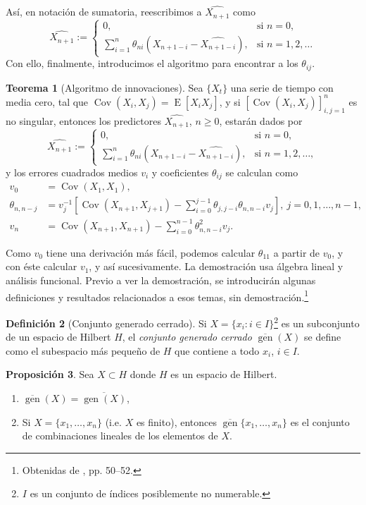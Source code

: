 \documentclass[11pt,letterpaper]{article}
\newcommand{\expected}{\ensuremath{\operatorname{E}}}
\newcommand{\covariance}{\ensuremath{\operatorname{Cov}}}
\theoremstyle{definition}
\newtheorem{definition}{Definición}[section]
\theoremstyle{theorem}
\newtheorem{theorem}[definition]{Teorema}
\newtheorem{proposition}[definition]{Proposición}
\theoremstyle{remark}
\begin{document}
	Así, en notación de sumatoria, reescribimos a \(\hat{X_{n+1}}\) como
	\[\hat{X_{n+1}}:=\begin{cases}0,&\mbox{si }n=0,\\\sum_{i=1}^{n}\theta_{ni}\left(X_{n+1-i}-\hat{X_{n+1-i}}\right),&\mbox{si }n=1,2,\dots\end{cases}\]
	Con ello, finalmente, introducimos el algoritmo para encontrar a los \(\theta_{ij}\).
	\begin{theorem}[Algoritmo de innovaciones] \label{teoremaInn}
		Sea \(\{X_t\}\) una serie de tiempo con media cero, tal que \(\covariance(X_i,X_j)=\expected[X_iX_j]\), y si \([\covariance(X_i,X_j)]_{i,j=1}^n\) es no singular, entonces los predictores \(\hat{X_{n+1}}\), \(n\geq0\), estarán dados por
		\[\hat{X_{n+1}}:=\begin{cases}0,&\mbox{si }n=0,\\\sum_{i=1}^{n}\theta_{ni}\left(X_{n+1-i}-\hat{X_{n+1-i}}\right),&\mbox{si }n=1,2,\dots,\end{cases}\]
		y los errores cuadrados medios \(v_i\) y coeficientes \(\theta_{ij}\) se calculan como
		\begin{align*}
			v_0&=\covariance(X_1,X_1), \\
			\theta_{n,n-j}&=v^{-1}_j\left[\covariance(X_{n+1},X_{j+1})-\sum_{i=0}^{j-1}\theta_{j,j-i}\theta_{n,n-i}v_j\right],\ j=0,1,\dots,n-1, \\
			v_n&=\covariance(X_{n+1},X_{n+1})-\sum_{i=0}^{n-1}\theta^2_{n,n-i}v_j.
		\end{align*}
	\end{theorem}
	Como \(v_0\) tiene una derivación más fácil, podemos calcular \(\theta_{11}\) a partir de \(v_0\), y con éste calcular \(v_1\), y así sucesivamente. La demostración usa álgebra lineal y análisis funcional. Previo a ver la demostración, se introducirán algunas definiciones y resultados relacionados a esos temas, sin demostración.\footnote{Obtenidas de \cite{brockwell2009time}, pp. 50--52.}
	\begin{definition}[Conjunto generado cerrado]
		Si \(X=\{x_i:i\in I\}\)\footnote{\(I\) es un conjunto de índices posiblemente no numerable.} es un subconjunto de un espacio de Hilbert \(H\), el \textit{conjunto generado cerrado} \(\overline{\operatorname{gen}}(X)\) se define como el subespacio más pequeño de \(H\) que contiene a todo \(x_i\), \(i\in I\).
	\end{definition}
	\begin{proposition} \label{propoCerrado}
		Sea \(X\subset H\) donde \(H\) es un espacio de Hilbert.
		\begin{enumerate}
			\item \(\overline{\operatorname{gen}}(X)=\overline{\operatorname{gen}(X)}\),
			\item Si \(X=\{x_1,\dots,x_n\}\) (i.e. \(X\) es finito), entonces \(\overline{\operatorname{gen}}\{x_1,\dots,x_n\}\) es el conjunto de combinaciones lineales de los elementos de \(X\).
		\end{enumerate}
	\end{proposition}
\end{document}
